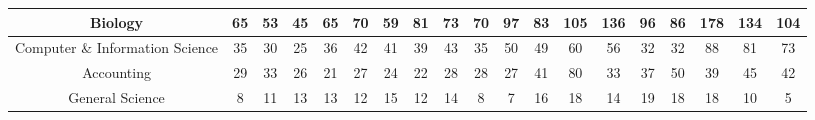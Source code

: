 \documentclass[10pt]{article}
\begin{document}
\begin{landscape}
\begin{longtable}[c]{|ccccccccccccccccccc|}
	\multicolumn{1}{|c|}{Biology}                                    & \multicolumn{1}{c|}{65}         & \multicolumn{1}{c|}{53}         & \multicolumn{1}{c|}{45}         & \multicolumn{1}{c|}{65}         & \multicolumn{1}{c|}{70}         & \multicolumn{1}{c|}{59}         & \multicolumn{1}{c|}{81}         & \multicolumn{1}{c|}{73}         & \multicolumn{1}{c|}{70}         & \multicolumn{1}{c|}{97}         & \multicolumn{1}{c|}{83}         & \multicolumn{1}{c|}{105}        & \multicolumn{1}{c|}{136}        & \multicolumn{1}{c|}{96}         & \multicolumn{1}{c|}{86}         & \multicolumn{1}{c|}{178}        & \multicolumn{1}{c|}{134}        & 104        \\ \hline
	\multicolumn{1}{|c|}{Computer \& Information Science}            & \multicolumn{1}{c|}{35}         & \multicolumn{1}{c|}{30}         & \multicolumn{1}{c|}{25}         & \multicolumn{1}{c|}{36}         & \multicolumn{1}{c|}{42}         & \multicolumn{1}{c|}{41}         & \multicolumn{1}{c|}{39}         & \multicolumn{1}{c|}{43}         & \multicolumn{1}{c|}{35}         & \multicolumn{1}{c|}{50}         & \multicolumn{1}{c|}{49}         & \multicolumn{1}{c|}{60}         & \multicolumn{1}{c|}{56}         & \multicolumn{1}{c|}{32}         & \multicolumn{1}{c|}{32}         & \multicolumn{1}{c|}{88}         & \multicolumn{1}{c|}{81}         & 73         \\ \hline
	\multicolumn{1}{|c|}{Accounting}                                 & \multicolumn{1}{c|}{29}         & \multicolumn{1}{c|}{33}         & \multicolumn{1}{c|}{26}         & \multicolumn{1}{c|}{21}         & \multicolumn{1}{c|}{27}         & \multicolumn{1}{c|}{24}         & \multicolumn{1}{c|}{22}         & \multicolumn{1}{c|}{28}         & \multicolumn{1}{c|}{28}         & \multicolumn{1}{c|}{27}         & \multicolumn{1}{c|}{41}         & \multicolumn{1}{c|}{80}         & \multicolumn{1}{c|}{33}         & \multicolumn{1}{c|}{37}         & \multicolumn{1}{c|}{50}         & \multicolumn{1}{c|}{39}         & \multicolumn{1}{c|}{45}         & 42         \\ \hline
	\multicolumn{1}{|c|}{General Science}                            & \multicolumn{1}{c|}{8}          & \multicolumn{1}{c|}{11}         & \multicolumn{1}{c|}{13}         & \multicolumn{1}{c|}{13}         & \multicolumn{1}{c|}{12}         & \multicolumn{1}{c|}{15}         & \multicolumn{1}{c|}{12}         & \multicolumn{1}{c|}{14}         & \multicolumn{1}{c|}{8}          & \multicolumn{1}{c|}{7}          & \multicolumn{1}{c|}{16}         & \multicolumn{1}{c|}{18}         & \multicolumn{1}{c|}{14}         & \multicolumn{1}{c|}{19}         & \multicolumn{1}{c|}{18}         & \multicolumn{1}{c|}{18}         & \multicolumn{1}{c|}{10}         & 5          \\ \hline

\end{longtable}
\end{landscape}
\end{document}
